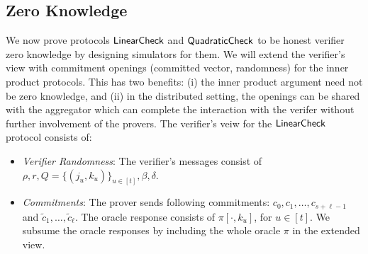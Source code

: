 \subsection{Zero Knowledge}
We now prove protocols $\mathsf{LinearCheck}$ and $\mathsf{QuadraticCheck}$ to be honest verifier
zero knowledge by designing simulators for them. We will extend the verifier's
view with commitment openings (committed vector, randomness) for the inner
product protocols. This has two benefits: (i) the inner product argument need
not be zero knowledge, and (ii) in the distributed setting, the openings can be
shared with the aggregator which can complete the interaction with the verifer
without further involvement of the provers. The verifier's veiw for
the $\mathsf{LinearCheck}$ protocol consists of:
\begin{itemize}[\leftmargin=0pt]
\item {\em Verifier Randomness}: The verifier's messages consist of $\rho, r, Q = \{(j_u,k_u)\}_{u\in [t]}, \beta, \delta$.

\item {\em Commitments}: The prover sends following commitments: $c_0, c_1,
\ldots, c_{s+\ell-1}$ and $\tilde{c}_1, \ldots, \tilde{c}_{\ell}$. The oracle
response consists of  $\pi[\cdot,k_u]$, for $u\in [t]$. We subsume the oracle
responses by including the whole oracle $\pi$ in the extended view.


\end{itemize}
